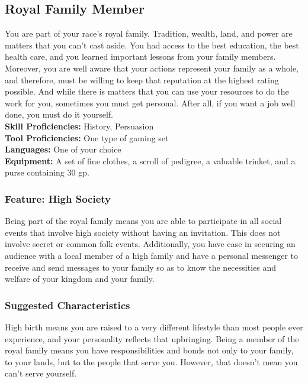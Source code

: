 \documentclass[10pt,twoside,twocolumn,openany]{book}
\begin{document}
\subsection{Royal Family Member}
You are part of your race's royal family. Tradition, wealth, land, and power are matters that you can't cast aside. You had access to the best education, the best health care, and you learned important lessons from your family members. Moreover, you are well aware that your actions represent your family as a whole, and therefore, must be willing to keep that reputation at the highest rating possible. And while there is matters that you can use your resources to do the work for you, sometimes you must get personal. After all, if you want a job well done, you must do it yourself.\\

\noindent \textbf{Skill Proficiencies:} History, Persuasion\\
\textbf{Tool Proficiencies:} One type of gaming set\\
\textbf{Languages:} One of your choice\\
\textbf{Equipment:} A set of fine clothes, a scroll of pedigree, a valuable trinket, and a purse containing 30 gp.

\subsubsection{Feature: High Society}
Being part of the royal family means you are able to participate in all social events that involve high society without having an invitation. This does not involve secret or common folk events. Additionally, you have ease in securing an audience with a local member of a high family and have a personal messenger to receive and send messages to your family so as to know the necessities and welfare of your kingdom and your family.


\subsubsection{Suggested Characteristics}
High birth means you are raised to a very different lifestyle than most people ever experience, and your personality reflects that upbringing. Being a member of the royal family means you have responsibilities and bonds not only to your family, to your lands, but to the people that serve you. However, that doesn't mean you can't serve yourself. 
\end{document}

